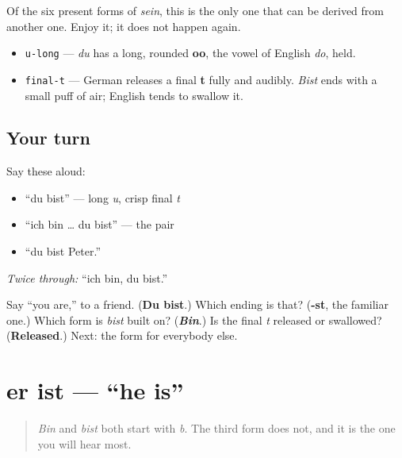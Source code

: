 Of the six present forms of \emph{sein}, this is the only one that can be derived from another one. Enjoy it; it does not happen again.

\begin{sounds}
\begin{itemize}
\raggedright
  \item \texttt{u-long} — \emph{du} has a long, rounded \textbf{oo}, the vowel of English \emph{do}, held.
  \item \texttt{final-t} — German releases a final \textbf{t} fully and audibly. \emph{Bist} ends with a small puff of air; English tends to swallow it.
\end{itemize}
\end{sounds}

\subsection*{Your turn}
Say these aloud:

\begin{itemize}
\raggedright
  \item \textquotedblleft{}du bist\textquotedblright{} — long \emph{u}, crisp final \emph{t}
  \item \textquotedblleft{}ich bin … du bist\textquotedblright{} — the pair
  \item \textquotedblleft{}du bist Peter.\textquotedblright{}
\end{itemize}

\emph{Twice through:} \textquotedblleft{}ich bin, du bist.\textquotedblright{}

\begin{tcolorbox}[breakable,colback=teal!4,colframe=teal!35!black,title={Before you move on}]
Say \textquotedblleft{}you are,\textquotedblright{} to a friend. (\textbf{Du bist}.) Which ending is that? (\textbf{-st}, the familiar one.) Which form is \emph{bist} built on? (\emph{\textbf{Bin}}.) Is the final \emph{t} released or swallowed? (\textbf{Released}.) Next: the form for everybody else.
\end{tcolorbox}
\section[er ist]{er ist — \textquotedblleft{}he is\textquotedblright{}}

\label{lesson:GE-C16-er-ist}



\begin{quote}
\emph{Bin} and \emph{bist} both start with \emph{b}. The third form does not, and it is the one you will hear most.
\end{quote}

